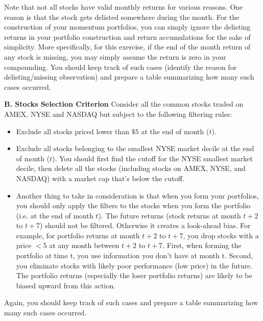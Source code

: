 Note that not all stocks have valid monthly returns for various reasons. One reason is that the stock gets delisted somewhere during the month. For the construction of your momentum portfolios, you can simply ignore the delisting returns in your portfolio construction and return accumulations for the sake of simplicity. More specifically, for this exercise, if the end of the month return of any stock is missing, you may simply assume the return is zero in your compounding. You should keep track of such cases (identify the reason for delisting/missing observation) and prepare a table summarizing how many such cases occurred. \twomedskip

\textbf{B. Stocks Selection Criterion}
Consider all the common stocks traded on AMEX, NYSE and NASDAQ but
subject to the following filtering rules:
	\begin{itemize}
	\item Exclude all stocks priced lower than $\$5$ at the end of month ($t$).
	\item Exclude all stocks belonging to the smallest NYSE market decile at the end of month ($t$). You should first find the cutoff for the NYSE smallest market decile, then delete all the stocks (including stocks on AMEX, NYSE, and NASDAQ) with a market cap that's below the cutoff.
	\item Another thing to take in consideration is that when you form your portfolios, you should only apply the filters to the stocks when you form the portfolio (i.e. at the end of month $t$). The future returns (stock returns at month $t+2$ to $t+7$) should not be filtered. Otherwise it creates a look-ahead bias. For example, for portfolio returns at month $t+2$ to $t+7$, you drop stocks with a price $<$5 at any month between $t+2$ to $t+7$. First, when forming the portfolio at time t, you use information you don't have at month t. Second, you eliminate stocks with likely poor performance (low price) in the future. The portfolio returns (especially the loser portfolio returns) are likely to be biased upward from this action. \twomedskip
\end{itemize}


Again, you should keep track of such cases and prepare a table summarizing how many such cases occurred. \twomedskip

